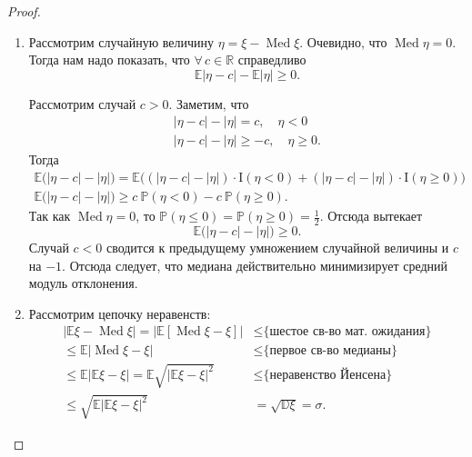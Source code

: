 \begin{proof}
    \begin{enumerate}
        \item Рассмотрим случайную величину $\eta = \xi - \operatorname{Med}\xi$. 
        Очевидно, что $\operatorname{Med} \eta = 0$. 
        Тогда нам надо показать, что $\forall \, c \in \mathbb{R} $ справедливо 
        \begin{equation*}
            \mathbb{E} |\eta - c| - \mathbb{E}|\eta| \geqslant 0.
        \end{equation*}
        
        Рассмотрим случай $c > 0$. Заметим, что 
        \begin{gather*}
            |\eta - c| - |\eta| = c, \quad \eta < 0 \\
            |\eta - c| - |\eta|  \geqslant -c, \quad \eta \geqslant 0.
        \end{gather*}
        Тогда
        \begin{gather*}
            \mathbb{E} \bigl(|\eta - c| - |\eta| \bigl) 
            = \mathbb{E} \bigl( (|\eta - c| - |\eta|) \cdot \mathrm{I}(\eta < 0) + (|\eta - c| - |\eta|) \cdot \mathrm{I}(\eta \geqslant 0) \bigl) \\
            \mathbb{E} \bigl( |\eta - c| - |\eta| \bigl) \geqslant c~\mathbb{P}(\eta < 0) - c~\mathbb{P}(\eta \geqslant 0).
        \end{gather*}
        Так как $\operatorname{Med}\eta = 0$, то $\mathbb{P}(\eta \leqslant 0) = \mathbb{P}(\eta \geqslant 0) = \frac{1}{2}$.
        Отсюда вытекает
        \begin{equation*}
            \mathbb{E}\bigl( |\eta - c| - |\eta| \bigl) \geqslant 0.
        \end{equation*}
        Случай $c < 0$ сводится к предыдущему умножением случайной величины и $c$ на $-1$. Отсюда следует, что медиана действительно минимизирует средний модуль отклонения.
        \item Рассмотрим цепочку неравенств:
        \begin{align*}
            |\mathbb{E}\xi - \operatorname{Med}\xi| =
            |\mathbb{E}\left[ \operatorname{Med}\xi - \xi \right]| & \leqslant 
            {\text{\{шестое св-во мат. ожидания\}}} \\ \leqslant 
            \mathbb{E} |\operatorname{Med}\xi - \xi| & \leqslant 
            {\text{\{первое св-во медианы\}}} \\ \leqslant
            \mathbb{E}| \mathbb{E}\xi - \xi| = 
            \mathbb{E} \sqrt{|\mathbb{E}\xi - \xi|^2} & \leqslant
            {\text{\{неравенство Йенсена\}}} \\ \leqslant 
            \sqrt{\mathbb{E}| \mathbb{E}\xi - \xi|^2} & = 
            \sqrt{\mathbb{D}\xi} = \sigma.
        \end{align*}
    \end{enumerate}
\end{proof}

